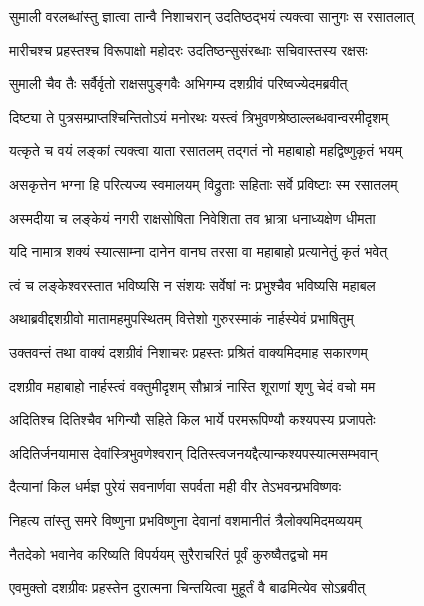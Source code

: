 \twolineshloka
{सुमाली वरलब्धांस्तु ज्ञात्वा तान्वै निशाचरान्}
{उदतिष्ठद्भयं त्यक्त्वा सानुगः स रसातलात्} %

\twolineshloka
{मारीचश्च प्रहस्तश्च विरूपाक्षो महोदरः}
{उदतिष्ठन्सुसंरब्धाः सचिवास्तस्य रक्षसः} %

\twolineshloka
{सुमाली चैव तैः सर्वैर्वृतो राक्षसपुङ्गवैः}
{अभिगम्य दशग्रीवं परिष्वज्येदमब्रवीत्} %

\twolineshloka
{दिष्ट्या ते पुत्रसम्प्राप्तश्चिन्तितोऽयं मनोरथः}
{यस्त्वं त्रिभुवणश्रेष्ठाल्लब्धवान्वरमीदृशम्} %

\twolineshloka
{यत्कृते च वयं लङ्कां त्यक्त्वा याता रसातलम्}
{तद्गतं नो महाबाहो महद्विष्णुकृतं भयम्} %

\twolineshloka
{असकृत्तेन भग्ना हि परित्यज्य स्वमालयम्}
{विद्रुताः सहिताः सर्वे प्रविष्टाः स्म रसातलम्} %

\twolineshloka
{अस्मदीया च लङ्केयं नगरी राक्षसोषिता}
{निवेशिता तव भ्रात्रा धनाध्यक्षेण धीमता} %

\twolineshloka
{यदि नामात्र शक्यं स्यात्साम्ना दानेन वानघ}
{तरसा वा महाबाहो प्रत्यानेतुं कृतं भवेत्} %

\twolineshloka
{त्वं च लङ्केश्वरस्तात भविष्यसि न संशयः}
{सर्वेषां नः प्रभुश्चैव भविष्यसि महाबल} %

\twolineshloka
{अथाब्रवीद्दशग्रीवो मातामहमुपस्थितम्}
{वित्तेशो गुरुरस्माकं नार्हस्येवं प्रभाषितुम्} %

\twolineshloka
{उक्तवन्तं तथा वाक्यं दशग्रीवं निशाचरः}
{प्रहस्तः प्रश्रितं वाक्यमिदमाह सकारणम्} %

\twolineshloka
{दशग्रीव महाबाहो नार्हस्त्वं वक्तुमीदृशम्}
{सौभ्रात्रं नास्ति शूराणां शृणु चेदं वचो मम} %

\twolineshloka
{अदितिश्च दितिश्चैव भगिन्यौ सहिते किल}
{भार्ये परमरूपिण्यौ कश्यपस्य प्रजापतेः} %

\twolineshloka
{अदितिर्जनयामास देवांस्त्रिभुवणेश्वरान्}
{दितिस्त्वजनयद्दैत्यान्कश्यपस्यात्मसम्भवान्} %

\twolineshloka
{दैत्यानां किल धर्मज्ञ पुरेयं सवनार्णवा}
{सपर्वता मही वीर तेऽभवन्प्रभविष्णवः} %

\twolineshloka
{निहत्य तांस्तु समरे विष्णुना प्रभविष्णुना}
{देवानां वशमानीतं त्रैलोक्यमिदमव्ययम्} %

\twolineshloka
{नैतदेको भवानेव करिष्यति विपर्ययम्}
{सुरैराचरितं पूर्वं कुरुष्वैतद्वचो मम} %

\twolineshloka
{एवमुक्तो दशग्रीवः प्रहस्तेन दुरात्मना}
{चिन्तयित्वा मुहूर्तं वै बाढमित्येव सोऽब्रवीत्} %

